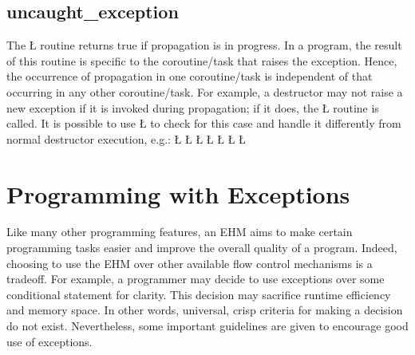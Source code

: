 \documentclass[openright,twoside]{report}
\begin{document}
\subsection{\texorpdfstring{\BGfont uncaught\_exception}{uncaught\_exception}}

The \LGinlinetrue\LGbegin\lgrinde\L{}\endlgrinde\LGend{} routine returns true if propagation is in progress.
In a \uC program, the result of this routine is specific to the coroutine/task that raises the exception.
Hence, the occurrence of propagation in one coroutine/task is independent of that occurring in any other coroutine/task.
For example, a destructor may not raise a new exception if it is invoked during propagation;
if it does, the \LGinlinetrue\LGbegin\lgrinde\L{}\endlgrinde\LGend{} routine is called.
It is possible to use \LGinlinetrue\LGbegin\lgrinde\L{}\endlgrinde\LGend{} to check for this case and handle it differently from normal destructor execution, e.g.:
\LGinlinefalse\LGbegin\lgrinde
\L{}
\CE{}\L{\LB{}}
\CE{}\L{\LB{}}
\CE{}\L{\LB{}}
\L{\LB{}}
\CE{}\L{\LB{}}
\L{\LB{\}}}
\endlgrinde\LGend


\section{Programming with Exceptions}

Like many other programming features, an EHM aims to make certain programming tasks easier and improve the overall quality of a program.
Indeed, choosing to use the EHM over other available flow control mechanisms is a tradeoff.
For example, a programmer may decide to use exceptions over some conditional statement for clarity.
This decision may sacrifice runtime efficiency and memory space.
In other words, universal, crisp criteria for making a decision do not exist.
Nevertheless, some important guidelines are given to encourage good use of exceptions.
\end{document}
